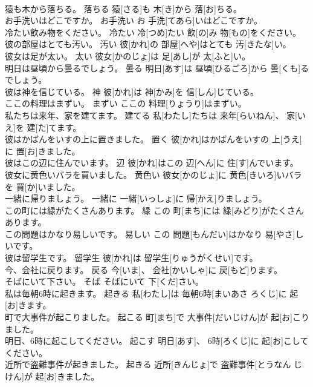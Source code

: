 \documentclass[8pt]{extreport}
\begin{document}
\begin{CJK}{UTF8}{min}
\\	猿も木から落ちる。	落ちる	猿[さる]も 木[き]から 落[お]ちる。	
\\	お手洗いはどこですか。	お手洗い	お 手洗[てあら]いはどこですか。	
\\	冷たい飲み物をください。	冷たい	冷[つめ]たい 飲[の]み 物[もの]をください。	
\\	彼の部屋はとても汚い。	汚い	彼[かれ]の 部屋[へや]はとても 汚[きたな]い。	
\\	彼女は足が太い。	太い	彼女[かのじょ]は 足[あし]が 太[ふと]い。	
\\	明日は昼頃から曇るでしょう。	曇る	明日[あす]は 昼頃[ひるごろ]から 曇[くも]るでしょう。	
\\	彼は神を信じている。	神	彼[かれ]は 神[かみ]を 信[しん]じている。	
\\	ここの料理はまずい。	まずい	ここの 料理[りょうり]はまずい。	
\\	私たちは来年、家を建てます。	建てる	私[わたし]たちは 来年[らいねん]、 家[いえ]を 建[た]てます。	
\\	彼はかばんをいすの上に置きました。	置く	彼[かれ]はかばんをいすの 上[うえ]に 置[お]きました。	
\\	彼はこの辺に住んでいます。	辺	彼[かれ]はこの 辺[へん]に 住[す]んでいます。	
\\	彼女に黄色いバラを買いました。	黄色い	彼女[かのじょ]に 黄色[きいろ]いバラを 買[か]いました。	
\\	一緒に帰りましょう。	一緒に	一緒[いっしょ]に 帰[かえ]りましょう。	
\\	この町には緑がたくさんあります。	緑	この 町[まち]には 緑[みどり]がたくさんあります。	
\\	この問題はかなり易しいです。	易しい	この 問題[もんだい]はかなり 易[やさ]しいです。	
\\	彼は留学生です。	留学生	彼[かれ]は 留学生[りゅうがくせい]です。	
\\	今、会社に戻ります。	戻る	今[いま]、 会社[かいしゃ]に 戻[もど]ります。	
\\	そばにいて下さい。	そば	そばにいて 下[くだ]さい。	
\\	私は毎朝6時に起きます。	起きる	私[わたし]は 毎朝6時[まいあさ ろくじ]に 起[お]きます。	
\\	町で大事件が起こりました。	起こる	町[まち]で 大事件[だいじけん]が 起[お]こりました。	
\\	明日、6時に起こしてください。	起こす	明日[あす]、 6時[ろくじ]に 起[お]こしてください。	
\\	近所で盗難事件が起きました。	起きる	近所[きんじょ]で 盗難事件[とうなん じけん]が 起[お]きました。	

\end{CJK}
\end{document}

